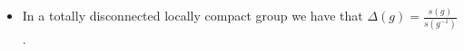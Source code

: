 \documentclass[preview]{standalone}
\begin{document}
\begin{center}
\begin{itemize} \item In a totally disconnected locally compact group we have that $\Delta(g) = \frac{s(g)}{s(g^{-1})}$\vspace{-10pt}.\end{itemize}
\end{center}
\end{document}
